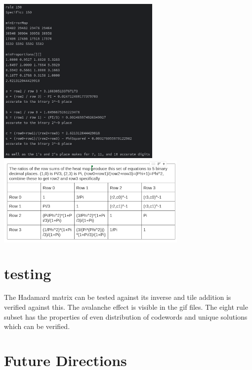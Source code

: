 \documentclass[11pt]{article}
\begin{document}
\begin{center}
\includegraphics{PiRatios}\\
\includegraphics{RatioEquations}\\
\end{center}

\section{testing}
The Hadamard matrix can be tested against its inverse and tile addition is verified against this. The avalanche effect is visible in the gif files. The eight rule subset has the properties of even distribution of codewords and unique solutions which can be verified.

\section{Future Directions}




\end{document}
